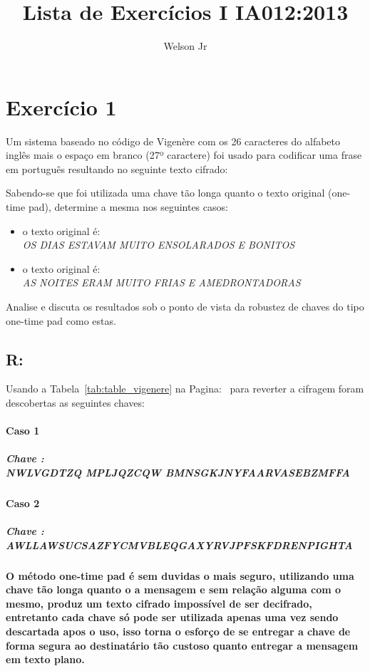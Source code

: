 \documentclass[10pt,a4paper]{article}
\author{Welson Jr}
\title{Lista de Exercícios I IA012:2013}
\begin{document}
\maketitle
\section*{Exercício 1}
Um sistema baseado no código de Vigenère com os 26 caracteres do alfabeto inglês mais o espaço em branco (27º caractere) foi usado para codificar uma frase em português resultando no seguinte texto cifrado:
\begin{center}
\end{center}
Sabendo-se que foi utilizada uma chave tão longa quanto o texto original (one-time pad), determine a mesma nos seguintes casos:
\begin{itemize}
\item o texto original é: \\ \emph{ OS DIAS ESTAVAM MUITO ENSOLARADOS E BONITOS }
\item o texto original é: \\ \emph{ AS NOITES ERAM MUITO FRIAS E AMEDRONTADORAS }
\end{itemize}
 Analise e discuta os resultados sob o ponto de vista da robustez de chaves do tipo one-time pad como estas.
\subsection*{R:}
Usando a Tabela~\ref{tab:table_vigenere} na Pagina:~\pageref{tab:table_vigenere} para reverter a cifragem foram descobertas as seguintes chaves:
\paragraph*{Caso 1}
\subparagraph*{Chave :\\ NWLVGDTZQ MPLJQZCQW BMNSGKJNYFAARVASEBZMFFA}
\paragraph*{Caso 2}
\subparagraph*{Chave :\\ AWLLAWSUCSAZFYCMVBLEQGAXYRVJPFSKFDRENPIGHTA}
\paragraph*{ O método one-time pad é sem duvidas o mais seguro, utilizando uma chave tão longa quanto o a mensagem e sem relação alguma com o mesmo, produz um texto cifrado impossível de ser decifrado, entretanto cada chave só pode ser utilizada apenas uma vez sendo descartada apos o uso, isso torna o esforço de se entregar a chave de forma segura ao destinatário tão custoso quanto entregar a mensagem em texto plano.  }
\end{document}
